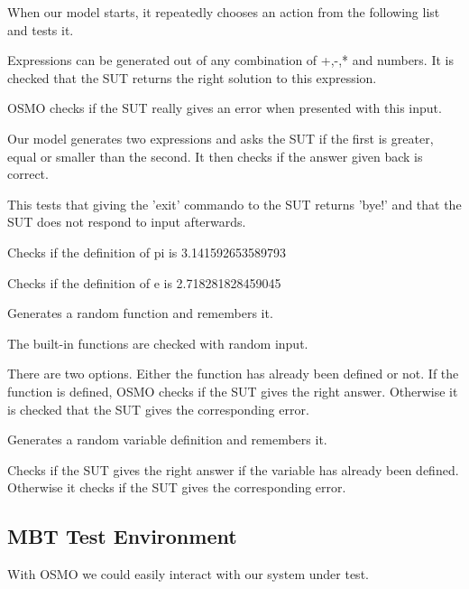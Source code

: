 \documentclass[11pt,a4paper]{article}
\begin{document}
When our model starts, it repeatedly chooses an action from the following list and tests it.
\begin{description}[labelindent=1cm]
	\item[\textbf{Expression}] Expressions can be generated out of any combination of +,-,* and numbers. It is checked that the SUT returns the right solution to this expression.
	\item[\textbf{1/0}] OSMO checks if the SUT really gives an error when presented with this input.
	\item[\textbf{equality}] Our model generates two expressions and asks the SUT if the first is greater, equal or smaller than the second. It then checks if the answer given back is correct.
	\item[\textbf{exit}] This tests that giving the 'exit' commando to the SUT returns 'bye!' and that the SUT does not respond to input afterwards.
	\item[\textbf{pi}] Checks if the definition of pi is 3.141592653589793
	\item[\textbf{e}] Checks if the definition of e is 2.718281828459045
	\item[\textbf{function definition}] Generates a random function and remembers it.
	\item[\textbf{built-in functions}] The built-in functions are checked with random input.
	\item[\textbf{function application}] There are two options. Either the function has already been defined or not. If the function is defined, OSMO checks if the SUT gives the right answer. Otherwise it is checked that the SUT gives the corresponding error.
	\item[\textbf{variable definition}] Generates a random variable definition and remembers it.
	\item[\textbf{variable application}] Checks if the SUT gives the right answer if the variable has already been defined. Otherwise it checks if the SUT gives the corresponding error.
\end{description}



\subsection{MBT Test Environment}
With OSMO we could easily interact with our system under test.
\end{document}
